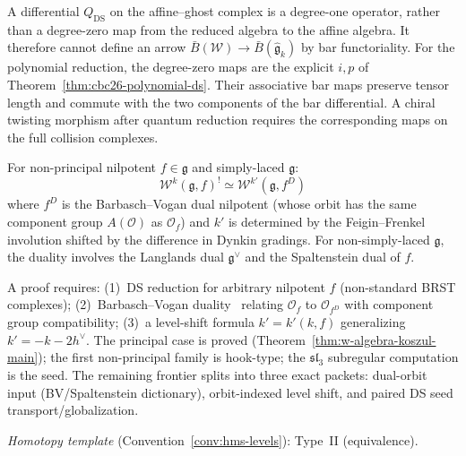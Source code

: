 \begin{remark}
\label{rem:w-twisting-morphism}
A differential $Q_{\mathrm{DS}}$ on the affine--ghost complex is a degree-one operator, rather than a degree-zero map from the reduced algebra to the affine algebra.
It therefore cannot define an arrow $\bar B(\mathcal W)\to\bar B(\widehat{\mathfrak g}_k)$ by bar functoriality.
For the polynomial reduction, the degree-zero maps are the explicit $i,p$ of Theorem~\ref{thm:cbc26-polynomial-ds}.
Their associative bar maps preserve tensor length and commute with the two components of the bar differential.
A chiral twisting morphism after quantum reduction requires the corresponding maps on the full collision complexes.
\end{remark}

\begin{conjecture}\label{conj:w-orbit-duality}
For non-principal nilpotent $f \in \mathfrak{g}$ and simply-laced $\mathfrak{g}$:
\begin{equation}
\mathcal{W}^k(\mathfrak{g}, f)^! \simeq \mathcal{W}^{k'}(\mathfrak{g}, f^D)
\end{equation}
where $f^D$ is the Barbasch--Vogan dual nilpotent (whose orbit has the same component group $A(\mathcal{O})$ as $\mathcal{O}_f$) and $k'$ is determined by the Feigin--Frenkel involution shifted by the difference in Dynkin gradings.  For non-simply-laced $\mathfrak{g}$, the duality involves the Langlands dual $\mathfrak{g}^\vee$ and the Spaltenstein dual of $f$.
\end{conjecture}

\begin{remark}[Scope]
A proof requires: (1)~DS reduction for arbitrary nilpotent $f$ (non-standard BRST complexes); (2)~Barbasch--Vogan duality~\cite{BV85} relating $\mathcal{O}_f$ to $\mathcal{O}_{f^D}$ with component group compatibility; (3)~a level-shift formula $k' = k'(k,f)$ generalizing $k' = -k - 2h^\vee$.  The principal case is proved (Theorem~\ref{thm:w-algebra-koszul-main}); the first non-principal family is hook-type; the $\mathfrak{sl}_3$ subregular computation is the seed.  The remaining frontier splits into three exact packets: dual-orbit input (BV/Spaltenstein dictionary), orbit-indexed level shift, and paired DS seed transport/globalization.

\emph{Homotopy template} (Convention~\ref{conv:hms-levels}): Type~II (equivalence).
\end{remark}

